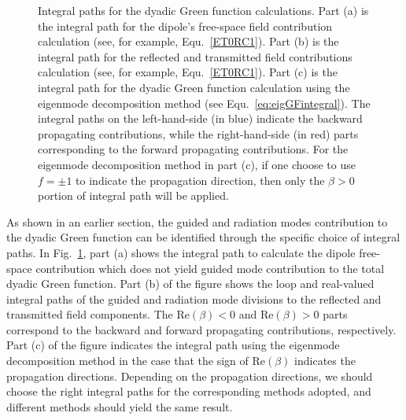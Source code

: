 \begin{figure}
\centering{}
\caption{Integral paths for the dyadic Green function calculations. Part (a) is the integral path for the dipole's free-space field contribution calculation (see, for example, Equ.~\eqref{ET0RC1}). Part (b) is the integral path for the reflected and transmitted field contributions calculation (see, for example, Equ.~\eqref{ET0RC1}). Part (c) is the integral path for the dyadic Green function calculation using the eigenmode decomposition method (see Equ.~\eqref{eq:eigGFintegral}). The integral paths on the left-hand-side (in blue) indicate the backward propagating contributions, while the right-hand-side (in red) parts corresponding to the forward propagating contributions. For the eigenmode decomposition method in part (c), if one choose to use $ f=\pm 1 $ to indicate the propagation direction, then only the $ \beta>0 $ portion of integral path will be applied. }
\label{fig:integralpaths}
\end{figure}

As shown in an earlier section, the guided and radiation modes contribution to the dyadic Green function can be identified through the specific choice of integral paths. In Fig.~\ref{fig:integralpaths}, part (a) shows the integral path to calculate the dipole free-space contribution which does not yield guided mode contribution to the total dyadic Green function. Part (b) of the figure shows the loop and real-valued integral paths of the guided and radiation mode divisions to the reflected and transmitted field components. The $ \mathrm{Re}(\beta)<0 $ and $ \mathrm{Re}(\beta)>0 $ parts correspond to the backward and forward propagating contributions, respectively. Part (c) of the figure indicates the integral path using the eigenmode decomposition method in the case that the sign of $ \mathrm{Re}(\beta) $ indicates the propagation directions. Depending on the propagation directions, we should choose the right integral paths for the corresponding methods adopted, and different methods should yield the same result. 

